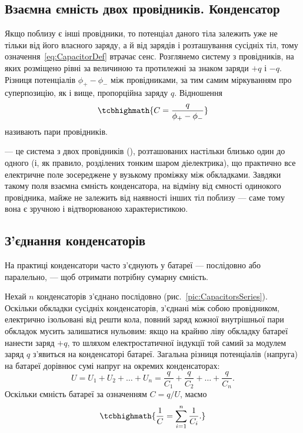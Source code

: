 \subsection*{Взаємна ємність двох провідників. Конденсатор}

Якщо поблизу є інші провідники, то потенціал даного тіла залежить уже не тільки від його власного заряду, а й від зарядів і розташування сусідніх
тіл, тому означення~\eqref{eq:CapacitorDef} втрачає сенс. Розглянемо систему з  провідників, на яких розміщено рівні за величиною та
протилежні за знаком заряди $+q$ і $-q$. Різниця потенціалів $\phi_+ - \phi_-$ між провідниками, за тим самим міркуванням про суперпозицію, як і
вище, пропорційна заряду $q$. Відношення
\begin{equation}\label{eq:MutualCapacitanceDef}
	\tcbhighmath{
		C = \frac{q}{\phi_+ - \phi_-}
	}
\end{equation}
називають  пари провідників.

\begin{Attention}
	 --- це система з двох провідників (), розташованих настільки близько один до одного (і, як правило,
	розділених тонким шаром діелектрика), що практично все електричне поле зосереджене у вузькому проміжку між обкладками. Завдяки такому
	 поля взаємна ємність конденсатора, на відміну від ємності одинокого провідника, майже не залежить від наявності інших тіл
	поблизу --- саме тому вона є зручною і відтворюваною характеристикою.
\end{Attention}

\subsection*{З'єднання конденсаторів}

На практиці конденсатори часто з'єднують у батареї --- послідовно або паралельно, --- щоб отримати потрібну сумарну ємність.

 Нехай $n$ конденсаторів з'єднано послідовно (рис.~\ref{pic:CapacitorsSeries}). Оскільки обкладки сусідніх
конденсаторів, з'єднані між собою провідником, електрично ізольовані від решти кола, повний заряд кожної внутрішньої пари обкладок мусить
залишатися нульовим: якщо на крайню ліву обкладку батареї нанести заряд $+q$, то шляхом електростатичної індукції той самий за модулем заряд $q$
з'явиться на  конденсаторі батареї. Загальна різниця потенціалів (напруга) на батареї дорівнює сумі напруг на окремих конденсаторах:
\begin{equation*}
	U = U_1 + U_2 + \ldots + U_n = \frac{q}{C_1} + \frac{q}{C_2} + \ldots + \frac{q}{C_n}.
\end{equation*}
Оскільки ємність батареї за означенням $C = q/U$, маємо
\begin{equation}\label{eq:SeriesCap}
	\tcbhighmath{
		\frac1C = \sum\limits_{i=1}^n \frac1{C_i}.
	}
\end{equation}


